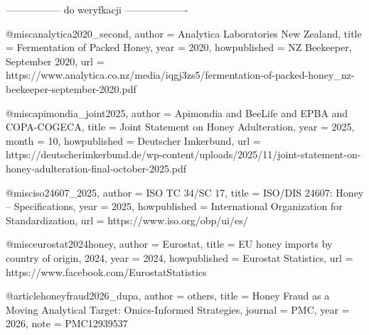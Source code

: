 









----------------- do weryfkacji -------------------




@misc{analytica2020_second,
  author       = {{Analytica Laboratories New Zealand}},
  title        = {{Fermentation of Packed Honey}},
  year         = {2020},
  howpublished = {NZ Beekeeper, September 2020},
  url          = {https://www.analytica.co.nz/media/iqgj3zs5/fermentation-of-packed-honey_nz-beekeeper-september-2020.pdf}
}




@misc{apimondia_joint2025,
  author       = {{Apimondia} and {BeeLife} and {EPBA} and {COPA-COGECA}},
  title        = {{Joint Statement on Honey Adulteration}},
  year         = {2025},
  month        = {10},
  howpublished = {Deutscher Imkerbund},
  url          = {https://deutscherimkerbund.de/wp-content/uploads/2025/11/joint-statement-on-honey-adulteration-final-october-2025.pdf}
}


@misc{iso24607_2025,
  author       = {{ISO TC 34/SC 17}},
  title        = {{ISO/DIS 24607: Honey -- Specifications}},
  year         = {2025},
  howpublished = {International Organization for Standardization},
  url          = {https://www.iso.org/obp/ui/es/}
}


@misc{eurostat2024honey,
  author       = {{Eurostat}},
  title        = {{EU honey imports by country of origin, 2024}},
  year         = {2024},
  howpublished = {Eurostat Statistics},
  url          = {https://www.facebook.com/EurostatStatistics}
}






@article{honeyfraud2026_dupa,
  author  = {others},
  title   = {{Honey Fraud as a Moving Analytical Target:
              Omics-Informed Strategies}},
  journal = {PMC},
  year    = {2026},
  note    = {PMC12939537}
}

